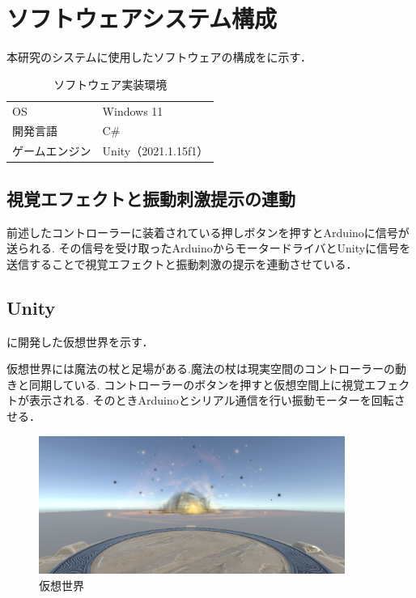 \section{ソフトウェアシステム構成}
本研究のシステムに使用したソフトウェアの構成をに示す．

\begin{table}[H]
    \caption{\label{tab;software}ソフトウェア実装環境}
    \centering
    \begin{tabular}{l|l}
    \hline
    \hline
    OS & Windows 11\\
    開発言語 & C\#\\
    ゲームエンジン & Unity（2021.1.15f1）\\
    \hline
    \end{tabular}
\end{table}

\subsection{視覚エフェクトと振動刺激提示の連動}
前述したコントローラーに装着されている押しボタンを押すとArduinoに信号が送られる.
その信号を受け取ったArduinoからモータードライバとUnityに信号を送信することで視覚エフェクトと振動刺激の提示を連動させている．

\subsection{Unity}
に開発した仮想世界を示す．

仮想世界には魔法の杖と足場がある.魔法の杖は現実空間のコントローラーの動きと同期している.
コントローラーのボタンを押すと仮想空間上に視覚エフェクトが表示される.
そのときArduinoとシリアル通信を行い振動モーターを回転させる．

\begin{figure}[h]
\centering
\includegraphics[clip,width=10cm]{fig/unity.png}
\caption{仮想世界}\label{virtualworld}
\end{figure}